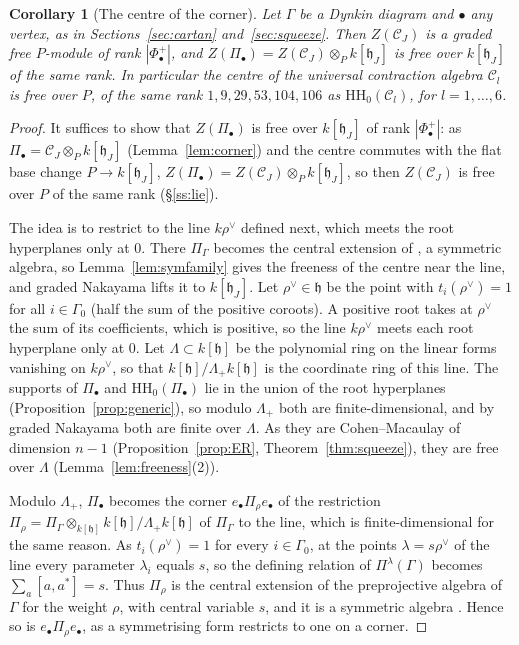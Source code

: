 \documentclass[11pt]{amsart}
\numberwithin{table}{section}
\numberwithin{figure}{section}
\numberwithin{equation}{section}
\newtheorem{cor}[thm]{Corollary}
\theoremstyle{definition}
\theoremstyle{plain}
\newcommand{\cC}{\mathcal{C}}
\newcommand{\h}{\mathfrak{h}}
\newcommand{\bul}{\bullet}
\newcommand{\HH}{\mathrm{HH}}
\begin{document}
\begin{cor}[The centre of the corner]\label{cor:centre}
Let $\Gamma$ be a Dynkin diagram and $\bul$ any vertex, as in Sections~\ref{sec:cartan} and~\ref{sec:squeeze}. Then $Z(\cC_J)$ is a graded free $P$-module of rank $|\Phi^+_\bul|$, and $Z(\Pi_\bul) = Z(\cC_J) \otimes_P k[\h_J]$ is free over $k[\h_J]$ of the same rank. In particular the centre of the universal contraction algebra $\cC_l$ is free over $P$, of the same rank $1, 9, 29, 53, 104, 106$ as $\HH_0(\cC_l)$, for $l = 1, \dots, 6$.
\end{cor}

\begin{proof}
It suffices to show that $Z(\Pi_\bul)$ is free over $k[\h_J]$ of rank $|\Phi^+_\bul|$: as $\Pi_\bul = \cC_J \otimes_P k[\h_J]$ (Lemma~\ref{lem:corner}) and the centre commutes with the flat base change $P \to k[\h_J]$, $Z(\Pi_\bul) = Z(\cC_J) \otimes_P k[\h_J]$, so then $Z(\cC_J)$ is free over $P$ of the same rank (\S\ref{ss:lie}).

The idea is to restrict to the line $k\rho^\vee$ defined next, which meets the root hyperplanes only at $0$. There $\Pi_\Gamma$ becomes the central extension of \cite{ELR}, a symmetric algebra, so Lemma~\ref{lem:symfamily} gives the freeness of the centre near the line, and graded Nakayama lifts it to $k[\h_J]$. Let $\rho^\vee \in \h$ be the point with $t_i(\rho^\vee) = 1$ for all $i \in \Gamma_0$ (half the sum of the positive coroots). A positive root takes at $\rho^\vee$ the sum of its coefficients, which is positive, so the line $k\rho^\vee$ meets each root hyperplane only at $0$. Let $\Lambda \subset k[\h]$ be the polynomial ring on the linear forms vanishing on $k\rho^\vee$, so that $k[\h]/\Lambda_+k[\h]$ is the coordinate ring of this line. The supports of $\Pi_\bul$ and $\HH_0(\Pi_\bul)$ lie in the union of the root hyperplanes (Proposition~\ref{prop:generic}), so modulo $\Lambda_+$ both are finite-dimensional, and by graded Nakayama both are finite over $\Lambda$. As they are Cohen--Macaulay of dimension $n - 1$ (Proposition~\ref{prop:ER}, Theorem~\ref{thm:squeeze}), they are free over $\Lambda$ (Lemma~\ref{lem:freeness}(2)).

Modulo $\Lambda_+$, $\Pi_\bul$ becomes the corner $e_\bul\Pi_\rho e_\bul$ of the restriction $\Pi_\rho = \Pi_\Gamma \otimes_{k[\h]} k[\h]/\Lambda_+k[\h]$ of $\Pi_\Gamma$ to the line, which is finite-dimensional for the same reason. As $t_i(\rho^\vee) = 1$ for every $i \in \Gamma_0$, at the points $\lambda = s\rho^\vee$ of the line every parameter $\lambda_i$ equals $s$, so the defining relation of $\Pi^\lambda(\Gamma)$ becomes $\sum_a [a, a^*] = s$. Thus $\Pi_\rho$ is the central extension of the preprojective algebra of $\Gamma$ for the weight $\rho$, with central variable $s$, and it is a symmetric algebra \cite[\S2.1, Prop~2.1]{ELR}. Hence so is $e_\bul\Pi_\rho e_\bul$, as a symmetrising form restricts to one on a corner.


\end{proof}
\end{document}
